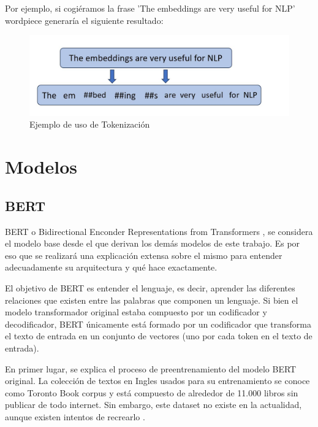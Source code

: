 Por ejemplo, si cogiéramos la frase 'The embeddings are very useful for NLP' wordpiece generaría el siguiente resultado:

\begin{figure}[H]
    \centering
    \includegraphics[width=12cm]{imagenes/Modelos/wordpiece.jpg}
    \caption{\centering Ejemplo de uso de Tokenización \cite{Bert-MLM}}
\end{figure}



\section{Modelos}
\subsection{BERT}
BERT o Bidirectional Enconder Representations from Transformers \cite{bert}, se considera el modelo base desde el que derivan los demás modelos de este trabajo. Es por eso que se realizará una explicación extensa sobre el mismo para entender adecuadamente su arquitectura y qué hace exactamente.

El objetivo de BERT \cite{devlin2018bert} es entender el lenguaje, es decir, aprender las diferentes relaciones que existen entre las palabras que componen un lenguaje. Si bien el modelo transformador original \cite{giacaglia2022transformers} estaba compuesto por un codificador y decodificador, BERT únicamente está formado por un codificador que transforma el texto de entrada en un conjunto de vectores (uno por cada token en el texto de entrada). 

En primer lugar, se explica el proceso de preentrenamiento del modelo BERT original. La colección de textos en Ingles usados para su entrenamiento se conoce como Toronto Book corpus \cite{toronto-book-corpus} y está compuesto de alrededor de 11.000 libros sin publicar de todo internet. Sin embargo, este dataset no existe en la actualidad, aunque existen intentos de recrearlo \cite{sgraaf-toronto}.

